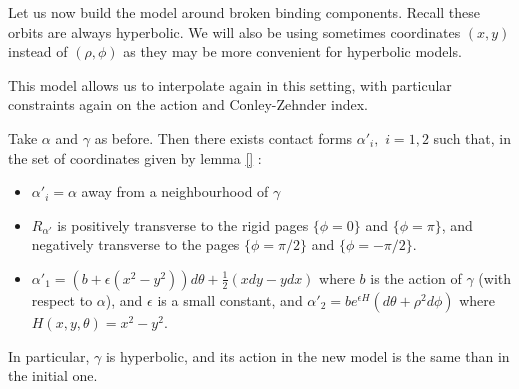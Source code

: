 \documentclass[../main.tex]{subfiles}
\begin{document}
Let us now build the model around broken binding components. Recall these orbits are always hyperbolic. We will also be using sometimes coordinates $(x,y)$ instead of $(\rho,\phi)$ as they may be more convenient for hyperbolic models.











This model allows us to interpolate again in this setting, with particular constraints again on the action and Conley-Zehnder index. 

\begin{lemma}\label{l:localmodhyp}
Take $\alpha$ and $\gamma$ as before. Then there exists contact forms $\alpha'_i,\,\,i = 1,2$ such that, in the set of coordinates given by lemma \ref{} :
\begin{itemize}
    \item $\alpha'_i = \alpha$ away from a neighbourhood of $\gamma$
    \item $R_{\alpha'}$ is positively transverse to the rigid pages $\{\phi = 0\}$ and $\{\phi = \pi\}$, and negatively transverse to the pages $\{\phi =\pi/2\}$ and $\{\phi = -\pi/2\}$.
    \item $\alpha'_1 = (b+\epsilon( x^2-y^2))d\theta + \frac{1}{2}(xdy -ydx)$ where $b$ is the action of $\gamma$ (with respect to $\alpha$), and $\epsilon$ is a small constant, and $\alpha'_2 = be^{\epsilon H}(d\theta + \rho^2d\phi)$ where $H(x,y,\theta) = x^2-y^2$.
\end{itemize}
In particular, $\gamma$ is hyperbolic, and its action in the new model is the same than in the initial one.
\end{lemma}
\end{document}
